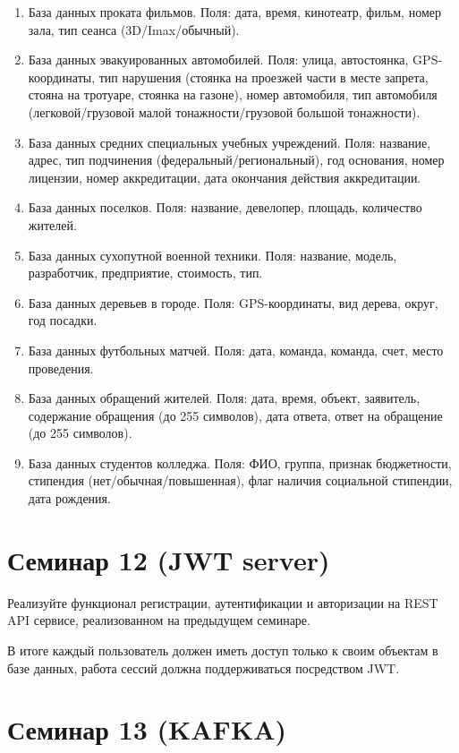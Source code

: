 \documentclass[12pt]{article}
\begin{document}
\begin{enumerate}
	\item База данных проката фильмов. Поля: дата, время, кинотеатр, фильм, номер зала, тип сеанса (3D/Imax/обычный).
	\item База данных эвакуированных автомобилей. Поля: улица, автостоянка, GPS-координаты, 
тип нарушения (стоянка на проезжей части в месте запрета, стояна на тротуаре, стоянка на газоне), 
номер автомобиля, тип автомобиля (легковой/грузовой малой тонажности/грузовой большой
тонажности). 
	\item База данных средних специальных учебных учреждений. Поля: название, адрес, тип подчинения (федеральный/региональный), 
год основания, номер лицензии, номер аккредитации, дата окончания действия аккредитации. 
	\item База данных поселков. Поля: название, девелопер, площадь, количество жителей.
	\item База данных сухопутной военной техники. Поля: название, модель, разработчик, предприятие, стоимость, тип. 
	\item База данных деревьев в городе. Поля: GPS-координаты, вид дерева, округ, год посадки. 
	\item База данных футбольных матчей. Поля: дата, команда, команда, счет, место проведения. 
	\item База данных обращений жителей. Поля: дата, время, объект, заявитель, содержание обращения (до 255 символов), 
дата ответа, ответ на обращение (до 255 символов).
	\item База данных студентов колледжа. Поля: ФИО, группа, признак бюджетности, 
стипендия (нет/обычная/повышенная), флаг наличия социальной стипендии, дата рождения.
\end{enumerate}



\section{Семинар 12 (JWT server)}

Реализуйте функционал регистрации, аутентификации и авторизации на REST API сервисе,
реализованном на предыдущем семинаре. 

В итоге каждый пользователь должен иметь доступ только к своим объектам в базе данных,
работа сессий должна поддерживаться посредством JWT.

\section{Семинар 13 (KAFKA)}
\end{document}
